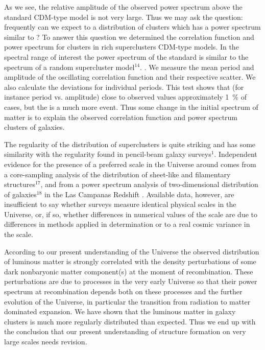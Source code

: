 As we see, the relative amplitude of the observed power spectrum above
the standard CDM-type model is not very large. Thus we may ask the
question: 
frequently can we expect to  a distribution of clusters
which has a power spectrum similar to ? To answer
this question we determined the correlation function and power
spectrum for clusters in rich superclusters  CDM-type
models. In the spectral range of interest the power spectrum of the
standard  is similar to the spectrum of a random
supercluster model$^{14}$. .  We measure the mean period and amplitude of the
oscillating correlation function and their respective scatter.  We
also calculate the deviations for individual periods.  This test shows
that  (for instance period vs.
amplitude) close to  observed values 
approximately 1~\% of cases, but the  is a much more 
event. Thus some change in the initial spectrum of matter is
 to explain the observed correlation function
and power spectrum  clusters of galaxies.

The regularity of the distribution of superclusters is quite striking
and has some similarity with the regularity found in pencil-beam galaxy
surveys$^1$.  Independent evidence for the presence of a preferred
scale in the Universe around  comes from a core-sampling
analysis of the distribution of sheet-like and filamentary 
structures$^{17}$, and from
a power spectrum analysis of  two-dimensional distribution of
galaxies$^{18}$ in the Las Campanas Redshift . Available
data, however, are insufficient to say whether  surveys
measure identical physical scales in the Universe, or, if so, whether
differences in numerical values of the scale are due to differences in
methods applied in determination or to a real cosmic variance in the
scale.


According to our present understanding of the Universe the observed
distribution of luminous matter is strongly correlated with the
density perturbations of some dark nonbaryonic matter component(s) at
the moment of recombination. These perturbations are due to processes
in the very early Universe so that their power spectrum at
recombination depends both on these processes and the further
evolution of the Universe, in particular the transition from radiation
to matter dominated expansion. We have shown that the luminous matter
in galaxy clusters is much more regularly distributed than
expected. Thus we end up with the conclusion that our present
understanding of structure formation on very large scales needs
revision.


